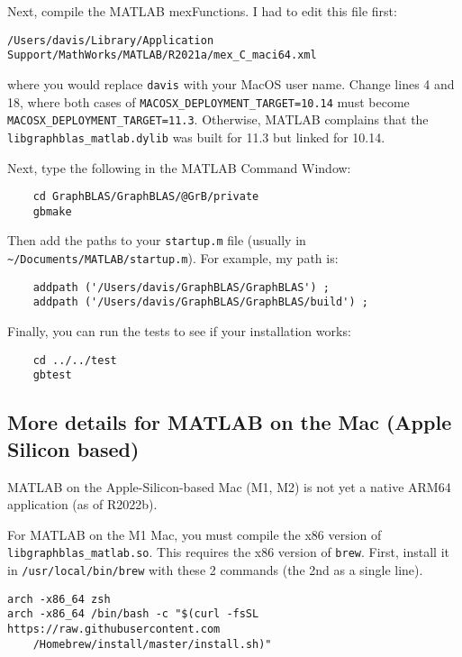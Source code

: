 \documentclass[12pt]{article}
\begin{document}
Next, compile the MATLAB mexFunctions.  I had to edit this file first:

{\small
\begin{verbatim}
/Users/davis/Library/Application Support/MathWorks/MATLAB/R2021a/mex_C_maci64.xml \end{verbatim} }

where you would replace \verb'davis' with your MacOS user name.
Change lines 4 and 18, where both cases of \verb'MACOSX_DEPLOYMENT_TARGET=10.14'
must become \verb"MACOSX_DEPLOYMENT_TARGET=11.3".  Otherwise, MATLAB
complains that the \verb'libgraphblas_matlab.dylib' was built for 11.3 but
linked for 10.14.

Next, type the following in the MATLAB Command Window:

    {\small
    \begin{verbatim}
    cd GraphBLAS/GraphBLAS/@GrB/private
    gbmake \end{verbatim} }

Then add the paths to your \verb'startup.m' file (usually in
\verb'~/Documents/MATLAB/startup.m').  For example, my path is:

    {\small
    \begin{verbatim}
    addpath ('/Users/davis/GraphBLAS/GraphBLAS') ;
    addpath ('/Users/davis/GraphBLAS/GraphBLAS/build') ; \end{verbatim} }

Finally, you can run the tests to see if your installation works:

    {\small
    \begin{verbatim}
    cd ../../test
    gbtest \end{verbatim} }

\subsection{More details for MATLAB on the Mac (Apple Silicon based)}

MATLAB on the Apple-Silicon-based Mac (M1, M2) is not yet a native ARM64
application (as of R2022b).

For MATLAB on the M1 Mac, you must compile the x86 version of
\verb'libgraphblas_matlab.so'.  This requires the x86 version of \verb'brew'.
First, install it in \verb'/usr/local/bin/brew' with these 2 commands (the 2nd
as a single line).

\begin{verbatim}
arch -x86_64 zsh
arch -x86_64 /bin/bash -c "$(curl -fsSL https://raw.githubusercontent.com
    /Homebrew/install/master/install.sh)"
\end{verbatim}
\end{document}
